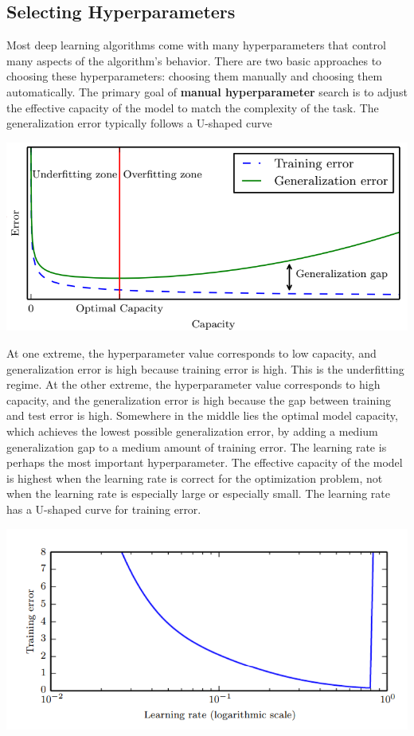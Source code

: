 \subsection{Selecting Hyperparameters}
Most deep learning algorithms come with many hyperparameters that control many aspects of the algorithm’s behavior. There are two basic approaches to choosing these hyperparameters: choosing them manually and choosing them automatically.\newline\newline
The primary goal of \textbf{manual hyperparameter} search is to adjust the effective capacity of the model to match the complexity of the task.
\newline\newline
The generalization error typically follows a U-shaped curve
\begin{center}
    \includegraphics[]{images/Gen-error.png}
\end{center}
At one extreme, the hyperparameter value corresponds to low capacity, and generalization error is high because training error is high. This is the underfitting regime. At the other extreme, the hyperparameter value corresponds to high capacity, and the generalization error is high because the gap between training and test error is high. Somewhere in the middle lies the optimal model capacity, which achieves the lowest possible generalization error, by adding a medium generalization gap to a medium amount of training error.\newline\newline
The learning rate is perhaps the most important hyperparameter. The effective capacity of the model is highest when the learning rate is correct for the optimization problem, not when the learning rate is especially large or especially small. The learning rate has a U-shaped curve for training error.
\begin{center}
    \includegraphics[]{images/lr.png}
\end{center}
